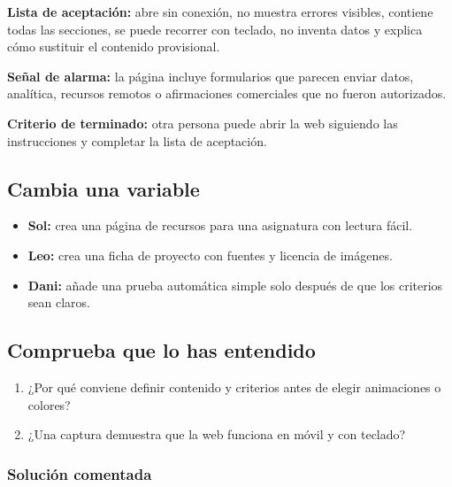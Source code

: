 \documentclass[10pt,a4paper,openany]{book}
\providecommand{\tightlist}{\setlength{\itemsep}{0.18em}\setlength{\parskip}{0pt}}
\begin{document}
\textbf{Lista de aceptación:} abre sin conexión, no muestra errores
visibles, contiene todas las secciones, se puede recorrer con teclado,
no inventa datos y explica cómo sustituir el contenido provisional.

\begin{warningbox}

\textbf{Señal de alarma:} la página incluye formularios que parecen
enviar datos, analítica, recursos remotos o afirmaciones comerciales que
no fueron autorizados.

\end{warningbox}

\begin{successbox}

\textbf{Criterio de terminado:} otra persona puede abrir la web
siguiendo las instrucciones y completar la lista de aceptación.

\end{successbox}

\subsection{Cambia una variable}\label{cambia-una-variable-10}

\begin{itemize}
\tightlist
\item
  \textbf{Sol:} crea una página de recursos para una asignatura con
  lectura fácil.
\item
  \textbf{Leo:} crea una ficha de proyecto con fuentes y licencia de
  imágenes.
\item
  \textbf{Dani:} añade una prueba automática simple solo después de que
  los criterios sean claros.
\end{itemize}

\subsection{Comprueba que lo has
entendido}\label{comprueba-que-lo-has-entendido-10}

\begin{enumerate}
\def\labelenumi{\arabic{enumi}.}
\tightlist
\item
  ¿Por qué conviene definir contenido y criterios antes de elegir
  animaciones o colores?
\item
  ¿Una captura demuestra que la web funciona en móvil y con teclado?
\end{enumerate}

\subsubsection{Solución comentada}\label{soluciuxf3n-comentada-11}
\end{document}

